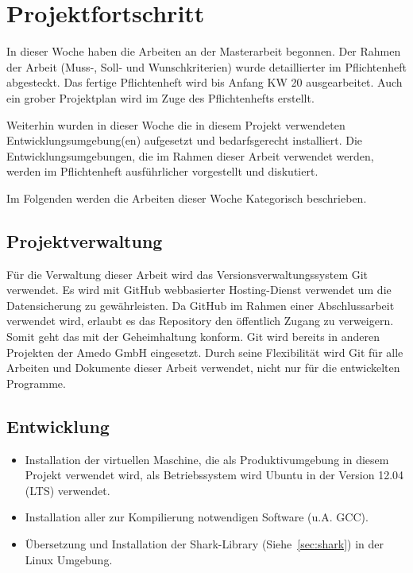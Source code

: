 \documentclass[a4paper,12pt,fleqn]{article}
\begin{document}
\section[Fortschritt]{Projektfortschritt}
In dieser Woche haben die Arbeiten an der Masterarbeit begonnen. Der Rahmen der Arbeit (Muss-, Soll- und Wunschkriterien)
wurde detaillierter im Pflichtenheft abgesteckt. Das fertige Pflichtenheft wird bis Anfang KW 20 ausgearbeitet. Auch ein grober Projektplan wird im Zuge des Pflichtenhefts erstellt.

Weiterhin wurden in dieser Woche die in diesem Projekt verwendeten Entwicklungsumgebung(en) aufgesetzt und bedarfsgerecht
installiert. Die Entwicklungsumgebungen, die im Rahmen dieser Arbeit verwendet werden, werden im Pflichtenheft ausführlicher vorgestellt und diskutiert.

Im Folgenden werden die Arbeiten dieser Woche Kategorisch beschrieben.

\subsection{Projektverwaltung}
Für die Verwaltung dieser Arbeit wird das Versionsverwaltungssystem Git verwendet. Es wird mit GitHub \cite{github} webbasierter
Hosting-Dienst verwendet um die Datensicherung zu gewährleisten. Da GitHub im Rahmen einer Abschlussarbeit verwendet wird, erlaubt
es das Repository den öffentlich Zugang zu verweigern. Somit geht das mit der Geheimhaltung konform. Git wird bereits
in anderen Projekten der Amedo GmbH eingesetzt. Durch seine Flexibilität wird Git für alle Arbeiten und Dokumente dieser Arbeit verwendet, nicht nur für die entwickelten Programme.

\subsection{Entwicklung}
\begin{itemize}
  \item Installation der virtuellen Maschine, die als Produktivumgebung in diesem Projekt verwendet wird, als Betriebssystem wird Ubuntu in der Version 12.04 (LTS) verwendet.
  \item Installation aller zur Kompilierung notwendigen Software (u.A. GCC).
  \item Übersetzung und Installation der Shark-Library (Siehe~\ref{sec:shark}) in der Linux Umgebung.
\end{itemize}
\end{document}
